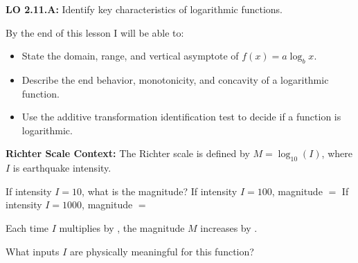 \documentclass[10pt]{article}
\begin{document}
\namedateperiod

\vspace{0.08in}

\begin{objectivebox}
\textbf{LO 2.11.A:} Identify key characteristics of logarithmic functions.

By the end of this lesson I will be able to:
\begin{itemize}[leftmargin=1.5em,itemsep=3pt,topsep=3pt]
  \item State the domain, range, and vertical asymptote of $f(x) = a\log_b x$.
  \item Describe the end behavior, monotonicity, and concavity of a logarithmic function.
  \item Use the additive transformation identification test to decide if a function is logarithmic.
\end{itemize}
\end{objectivebox}

\vspace{0.06in}

\begin{vocabbox}
\end{vocabbox}

\vspace{0.06in}

\begin{hookbox}
\textbf{Richter Scale Context:} The Richter scale is defined by $M = \log_{10}(I)$, where
$I$ is earthquake intensity.

\vspace{4pt}
If intensity $I = 10$, what is the magnitude? \blank{2cm}
If intensity $I = 100$, magnitude $= $ \blank{2cm}
If intensity $I = 1000$, magnitude $= $ \blank{2cm}

\vspace{4pt}
Each time $I$ multiplies by \blank{1.5cm}, the magnitude $M$ increases by \blank{1.5cm}.

\vspace{4pt}
What inputs $I$ are physically meaningful for this function? \writeline
\end{hookbox}
\end{document}
